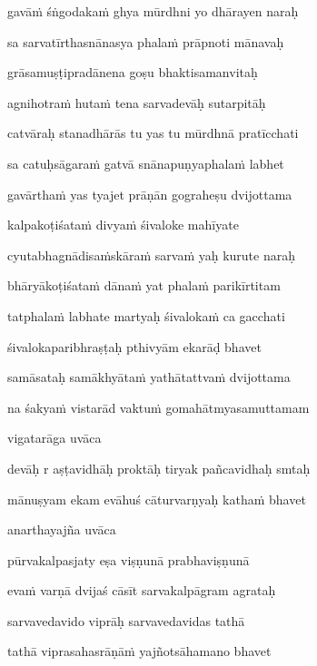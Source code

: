 gavāṁ śṅgodakaṁ ghya mūrdhni yo dhārayen naraḥ\thinspace{\dandab} \dontdisplaylinenum

sa sarvatīrthasnānasya phalaṁ prāpnoti mānavaḥ \veg\dontdisplaylinenum

grāsamuṣṭipradānena goṣu bhaktisamanvitaḥ\thinspace{\dandab} \dontdisplaylinenum

agnihotraṁ hutaṁ tena sarvadevāḥ sutarpitāḥ \veg\dontdisplaylinenum

catvāraḥ stanadhārās tu yas tu mūrdhnā pratīcchati\thinspace{\dandab} \dontdisplaylinenum

sa catuḥsāgaraṁ gatvā snānapuṇyaphalaṁ labhet \veg\dontdisplaylinenum

gavārthaṁ yas tyajet prāṇān gograheṣu dvijottama\thinspace{\dandab} \dontdisplaylinenum

kalpakoṭiśataṁ divyaṁ śivaloke mahīyate \veg\dontdisplaylinenum

cyutabhagnādisaṁskāraṁ sarvaṁ yaḥ kurute naraḥ\thinspace{\dandab} \dontdisplaylinenum

bhāryākoṭiśataṁ dānaṁ yat phalaṁ parikīrtitam \veg\dontdisplaylinenum 

tatphalaṁ labhate martyaḥ śivalokaṁ ca gacchati\thinspace{\dandab} \dontdisplaylinenum

śivalokaparibhraṣṭaḥ pthivyām ekarāḍ bhavet \veg\dontdisplaylinenum

samāsataḥ samākhyātaṁ yathātattvaṁ dvijottama\thinspace{\dandab} \dontdisplaylinenum

na śakyaṁ vistarād vaktuṁ gomahātmyasamuttamam \veg\dontdisplaylinenum

vigatarāga uvāca~{\dandab}\dontdisplaylinenum 

devāḥ r aṣṭavidhāḥ proktāḥ tiryak pañcavidhaḥ smtaḥ\thinspace{\danda} \dontdisplaylinenum

mānuṣyam ekam evāhuś cāturvarṇyaḥ kathaṁ bhavet \veg\dontdisplaylinenum

anarthayajña uvāca~{\dandab}\dontdisplaylinenum 

pūrvakalpasjaty eṣa viṣṇunā prabhaviṣṇunā\thinspace{\danda} \dontdisplaylinenum

evaṁ varṇā dvijaś cāsīt sarvakalpāgram agrataḥ \veg\dontdisplaylinenum

sarvavedavido viprāḥ sarvavedavidas tathā\thinspace{\dandab} \dontdisplaylinenum

tathā viprasahasrāṇāṁ yajñotsāhamano bhavet \veg\dontdisplaylinenum


